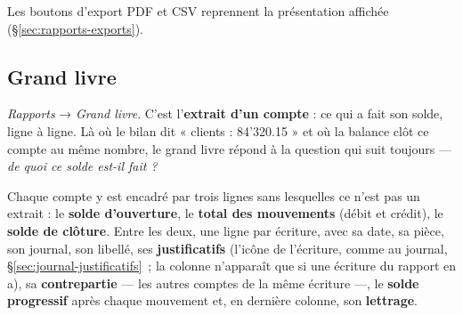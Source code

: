\documentclass[a4paper,11pt,oneside]{article}
\begin{document}
Les boutons d'export PDF et CSV reprennent la présentation affichée
(\S\ref{sec:rapports-exports}).

\subsection{Grand livre}\label{sec:grand-livre}

\emph{Rapports} → \emph{Grand livre}. C'est l'\textbf{extrait d'un compte} : ce qui a fait son
solde, ligne à ligne. Là où le bilan dit « clients : 84'320.15 » et où la balance clôt ce compte au
même nombre, le grand livre répond à la question qui suit toujours — \emph{de quoi ce solde
est-il fait ?}

Chaque compte y est encadré par trois lignes sans lesquelles ce n'est pas un extrait : le
\textbf{solde d'ouverture}, le \textbf{total des mouvements} (débit et crédit), le \textbf{solde
de clôture}. Entre les deux, une ligne par écriture, avec sa date, sa pièce, son journal, son
libellé, ses \textbf{justificatifs} (l'icône de l'écriture, comme au journal, \S\ref{sec:journal-justificatifs}~; la
colonne n'apparaît que si une écriture du rapport en a), sa \textbf{contrepartie} — les autres comptes de la même écriture —, le \textbf{solde
progressif} après chaque mouvement et, en dernière colonne, son \textbf{lettrage}.
\end{document}
